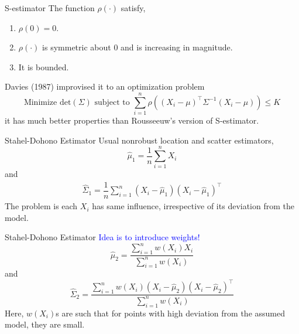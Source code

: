 \documentclass[10pt,xcolor=svgnames]{beamer} %
\newcommand{\tr}{^{\intercal}}
\begin{document}
\begin{frame}{S-estimator}
    The function $\rho(\cdot)$ satisfy,
    \begin{enumerate}
        \item $\rho(0) = 0$.
        \item $\rho(\cdot)$ is symmetric about $0$ and is increasing in magnitude.
        \item It is bounded.
    \end{enumerate}
    Davies (1987) improvised it to an optimization problem
    \begin{equation*}
        \text{Minimize } \text{det}(\Sigma) \text{ subject to } \sum_{i=1}^n  \rho\left( (X_i - \mu)\tr \Sigma^{-1} (X_i - \mu ) \right) \leq K
    \end{equation*}
    it has much better properties than Rousseeuw's version of S-estimator.
\end{frame}

\begin{frame}{Stahel-Dohono Estimator}
    Usual nonrobust location and scatter estimators,\\
    \begin{equation*}
        \widehat{\mu}_1 = \dfrac{1}{n}\sum_{i=1}^n X_i
    \end{equation*}
    \noindent and \\
    \begin{align*}
        \widehat{\Sigma}_1 = \dfrac{1}{n}\sum_{i=1}^n (X_i - \widehat{\mu}_1)(X_i - \widehat{\mu}_1)\tr 
    \end{align*}
    The problem is each $X_i$ has same influence, irrespective of its deviation from the model.
\end{frame}


\begin{frame}{Stahel-Dohono Estimator}
    \textcolor{blue}{Idea is to introduce weights!}\\
    \begin{equation*}
        \widehat{\mu}_2 = \dfrac{\sum_{i=1}^n w(X_i) X_i}{\sum_{i=1}^n w(X_i)}
    \end{equation*}
    \noindent and\\
    \begin{equation*}
        \widehat{\Sigma}_2 = \dfrac{\sum_{i=1}^n w(X_i) (X_i - \widehat{\mu}_2)(X_i - \widehat{\mu}_2)\tr}{\sum_{i=1}^n w(X_i)}
    \end{equation*}
    Here, $w(X_i)$s are such that for points with high deviation from the assumed model, they are small.
\end{frame}
\end{document}

